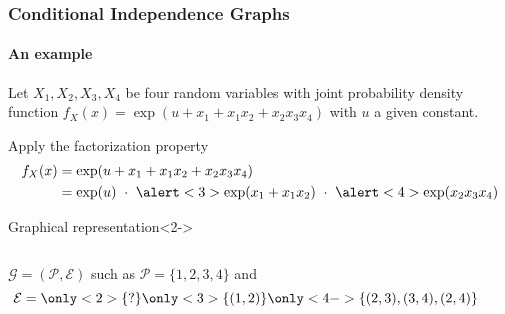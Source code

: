 \begin{frame}
  \frametitle{Conditional Independence Graphs}
  \framesubtitle{An example}
  
  Let  $X_1,  X_2, X_3,  X_4$  be  four  random variables  with  joint
  probability density  function $f_X(x) =  \exp(u + x_1+x_1 x_2  + x_2
  x_3 x_4)$ with $u$ a given constant.
  
  \begin{block}{Apply the factorization property}
    \begin{equation*}
      \begin{aligned}
        f_X(x) & = \exp(u + x_1+x_1 x_2 + x_2 x_3 x_4) \\
        &  = \exp(u)\  \cdot \  \alert<3>{\exp(x_1+x_1 x_2)}\  \cdot \
        \alert<4>{\exp(x_2 x_3 x_4)} 
      \end{aligned}
    \end{equation*}
  \end{block}
  
  \vfill

  \begin{block}{Graphical representation}<2->
    
    \begin{columns}[c]
      \begin{column}{.5\textwidth}
        $\mathcal{G} = (\mathcal{P},\mathcal{E})$ such as $\mathcal{P}
        = \{1,2,3,4\}$ and 
        \begin{equation*}
          \mathcal{E} = \only<2>{\{?\}}
          \only<3>{\{(1,2)\}}
          \only<4->{\{(2,3),(3,4),(2,4)\}}
        \end{equation*}
      \end{column}
      \begin{column}{.5\textwidth}
        \begin{center}
        \end{center}
      \end{column}
    \end{columns}
  \end{block}

\end{frame}

